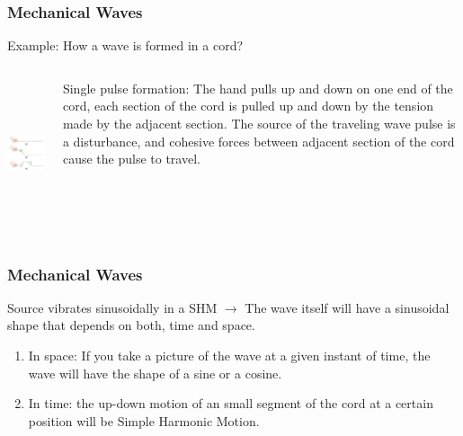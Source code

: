 \documentclass[]{beamer}
\begin{document}
\begin{frame}
\frametitle{Mechanical Waves}

Example: How a wave is formed in a cord?
\vspace{5mm}

\pause


   \begin{columns}[c]
   \column{2in}  %
  
\begin{center}
  \includegraphics[height=1.7in]{images4/1.jpg}
\end{center}
\pause
   \column{2in}
Single pulse formation: The hand pulls up and down on one end of the cord, each section of the cord is pulled up and down by the tension made by the adjacent section.
The source of the traveling wave pulse is a disturbance, and cohesive forces between adjacent section of the cord cause the pulse to travel.
   \end{columns}






  \end{frame}
\begin{frame}
\frametitle{Mechanical Waves}


Source vibrates sinusoidally in a SHM $\rightarrow$ The wave itself will have a sinusoidal shape that depends on both,  time and space. 
\pause
\vspace{5mm}

\begin{enumerate}
\item In space: If you take a picture of the wave at a given instant of time, the wave will have the shape of a sine or a cosine.
\pause
\item In time: the up-down motion of  an small segment  of  the cord at a certain position will be Simple Harmonic Motion.

\end{enumerate}

  \end{frame}
\end{document}
